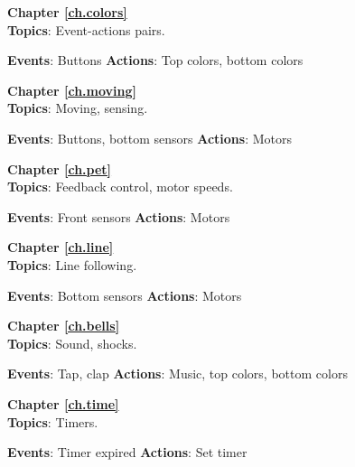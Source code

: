  \hfill {}

\bigskip

{\centering \textbf{Chapter \ref{ch.colors}}\\}
\textbf{Topics}: Event-actions pairs.

\textbf{Events}: Buttons \hfill \textbf{Actions}: Top colors, bottom colors

 \hfill {} \quad {}

\bigskip

{\centering \textbf{Chapter \ref{ch.moving}}\\}
\textbf{Topics}: Moving, sensing.

\textbf{Events}: Buttons, bottom sensors \hfill \textbf{Actions}: Motors

 \quad {} \hfill  {}

\bigskip

{\centering \textbf{Chapter \ref{ch.pet}}\\}
\textbf{Topics}: Feedback control, motor speeds.

\textbf{Events}: Front sensors \hfill \textbf{Actions}: Motors

 \hfill {}

\bigskip

{\centering \textbf{Chapter \ref{ch.line}}\\}
\textbf{Topics}: Line following.

\textbf{Events}: Bottom sensors \hfill \textbf{Actions}: Motors

 \hfill {}

\bigskip

{\centering \textbf{Chapter \ref{ch.bells}}\\}
\textbf{Topics}: Sound, shocks.

\textbf{Events}: Tap, clap \hfill \textbf{Actions}: Music, top colors,
bottom colors

 \quad {} \hfill {}
\quad {} \quad {}

\bigskip

{\centering \textbf{Chapter \ref{ch.time}}\\}
\textbf{Topics}: Timers.

\textbf{Events}: Timer expired \hfill \textbf{Actions}: Set timer

